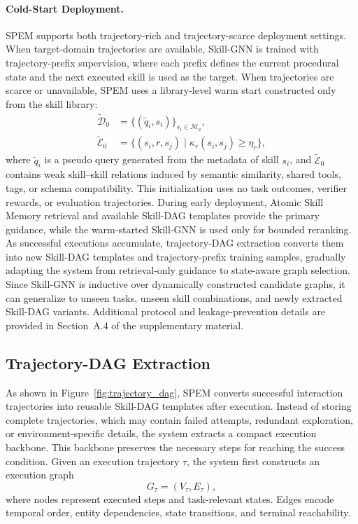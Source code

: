 \documentclass[letterpaper]{article} %
\newcommand{\model}{\textsc{SPEM}}
\begin{document}
\paragraph{Cold-Start Deployment.}
\model{} supports both trajectory-rich and trajectory-scarce deployment settings.
When target-domain trajectories are available, Skill-GNN is trained with
trajectory-prefix supervision, where each prefix defines the current procedural
state and the next executed skill is used as the target. When trajectories are
scarce or unavailable, \model{} uses a library-level warm start constructed only
from the skill library:
\begin{align}
\widetilde{\mathcal{D}}_{0}
&=
\{(\tilde{q}_{i}, s_i)\}_{s_i\in\mathcal{M}_{a}},\\
\widetilde{\mathcal{E}}_{0}
&=
\{(s_i,r,s_j)\mid \kappa_r(s_i,s_j)\ge \eta_r\},
\end{align}
where $\tilde{q}_{i}$ is a pseudo query generated from the metadata of skill
$s_i$, and $\widetilde{\mathcal{E}}_{0}$ contains weak skill--skill relations
induced by semantic similarity, shared tools, tags, or schema compatibility.
This initialization uses no task outcomes, verifier rewards, or evaluation
trajectories. During early deployment, Atomic Skill Memory retrieval and
available Skill-DAG templates provide the primary guidance, while the
warm-started Skill-GNN is used only for bounded reranking. As successful
executions accumulate, trajectory-DAG extraction converts them into new
Skill-DAG templates and trajectory-prefix training samples, gradually adapting
the system from retrieval-only guidance to state-aware graph selection. Since
Skill-GNN is inductive over dynamically constructed candidate graphs, it can
generalize to unseen tasks, unseen skill combinations, and newly extracted
Skill-DAG variants. Additional protocol and leakage-prevention details are
provided in Section~A.4 of the supplementary material.


\subsection{Trajectory-DAG Extraction}
As shown in Figure~\ref{fig:trajectory_dag}, \model{} converts successful interaction trajectories into reusable Skill-DAG templates after execution. Instead of storing complete trajectories, which may contain failed attempts, redundant exploration, or environment-specific details, the system extracts a compact execution backbone.  This backbone preserves the necessary steps for reaching the success condition. Given an execution trajectory $\tau$, the system first constructs an execution graph
\begin{equation}
G_{\tau}=(V_{\tau},E_{\tau}),
\end{equation}
where nodes represent executed steps and task-relevant states. Edges encode temporal order, entity dependencies, state transitions, and terminal reachability.
\end{document}
